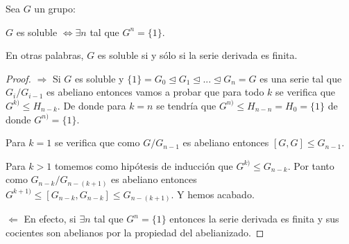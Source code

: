 \begin{nth}
Sea $G$ un grupo:

$G$ es soluble $\iff \exists n $ tal que $G^{n} = \{1\}$.

En otras palabras, $G$ es soluble si y sólo si la serie derivada es finita.
\end{nth}
\begin{proof}
$\Rightarrow$ Si $G$ es soluble y $\{1\} = G_0 \trianglelefteq G_1 \trianglelefteq ... \trianglelefteq G_n = G$ es una serie tal que $G_i/G_{i-1}$ es abeliano entonces vamos a probar que para todo $k$ se verifica que $G^{k)} \le H_{n-k}$. De donde para $k = n$ se tendría que $G^{n)} \le H_{n-n} = H_0 = \{1\}$ de donde $G^{n)} = \{1\}$.

Para $k = 1$ se verifica que como $G/G_{n-1}$ es abeliano entonces $[G,G]  \le G_{n-1}$. 

Para $k > 1$ tomemos como hipótesis de inducción que $G^{k)} \le G_{n-k}$. Por tanto como $G_{n-k}/G_{n-(k+1)}$ es abeliano entonces $G^{k+1)} \le [G_{n-k},G_{n-k}] \le G_{n-(k+1)}$. Y hemos acabado.

$\Leftarrow$ En efecto, si $\exists n $ tal que $G^{n} = \{1\}$ entonces la serie derivada es finita y sus cocientes son abelianos por la propiedad del abelianizado.
\end{proof}
